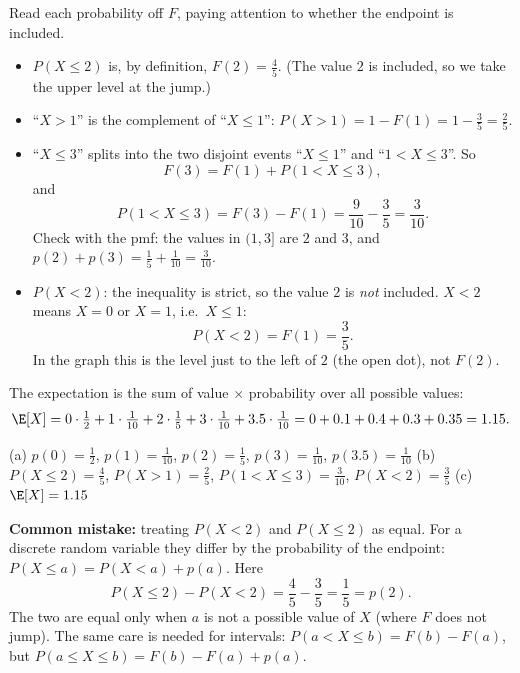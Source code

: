 \begin{solution}
	 Read each probability off $F$, paying attention to whether the
	endpoint is included.
	\begin{itemize}
		\item $P(X\le 2)$ is, by definition, $F(2)=\frac45$. (The value $2$ is
		      included, so we take the upper level at the jump.)
		\item ``$X>1$'' is the complement of ``$X\le1$'':
		      $P(X>1)=1-F(1)=1-\frac35=\frac25$.
		\item ``$X\le3$'' splits into the two disjoint events ``$X\le1$'' and
		      ``$1<X\le3$''. So
		      \[ F(3)=F(1)+P(1<X\le3), \]
		      and
		      \[ P(1<X\le3)=F(3)-F(1)=\frac{9}{10}-\frac35=\frac{3}{10}. \]
		      Check with the pmf: the values in $(1,3]$ are $2$ and $3$, and
		      $p(2)+p(3)=\frac15+\frac1{10}=\frac3{10}$.
		\item $P(X<2)$: the inequality is strict, so the value $2$ is
		      \emph{not} included. $X<2$ means $X=0$ or $X=1$, i.e.\ $X\le1$:
		      \[ P(X<2)=F(1)=\frac35. \]
		      In the graph this is the level just to the left of $2$ (the open
		      dot), not $F(2)$.
	\end{itemize}

	 The expectation is the sum of value $\times$ probability over
	all possible values:
	\[
		\E[X]=0\cdot\tfrac12+1\cdot\tfrac1{10}+2\cdot\tfrac15+3\cdot\tfrac1{10}
		+3.5\cdot\tfrac1{10}=0+0.1+0.4+0.3+0.35=1.15.
	\]

	\begin{answer}
		(a) $p(0)=\frac12$, $p(1)=\frac1{10}$, $p(2)=\frac15$,
		$p(3)=\frac1{10}$, $p(3.5)=\frac1{10}$ \quad
		(b) $P(X\le2)=\frac45$, $P(X>1)=\frac25$, $P(1<X\le3)=\frac3{10}$,
		$P(X<2)=\frac35$ \quad
		(c) $\E[X]=1.15$
	\end{answer}
	\begin{remark}
		\textbf{Common mistake:} treating $P(X<2)$ and $P(X\le2)$ as equal.
		For a discrete random variable they differ by the probability of the
		endpoint: $P(X\le a)=P(X<a)+p(a)$. Here
		\[ P(X\le2)-P(X<2)=\frac45-\frac35=\frac15=p(2). \]
		The two are equal only
		when $a$ is not a possible value of $X$ (where $F$ does not jump).
		The same care is needed for intervals: $P(a<X\le b)=F(b)-F(a)$, but
		$P(a\le X\le b)=F(b)-F(a)+p(a)$.
	\end{remark}
\end{solution}
